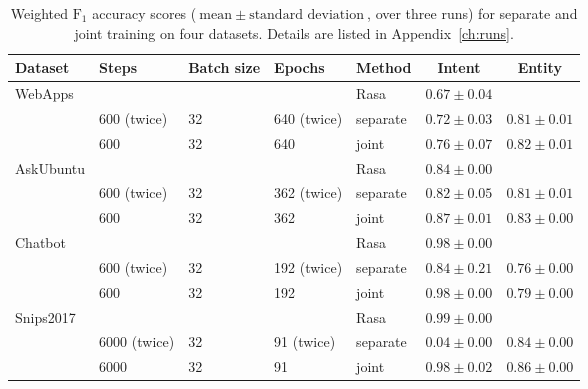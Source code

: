 \begin{table}[htbp]
    \centering
    \begin{tabular}{l l l l l c c}
        \textbf{Dataset}    & \textbf{Steps}  & \textbf{Batch size} & \textbf{Epochs}  & \textbf{Method}   & \textbf{Intent}  & \textbf{Entity}\\
        \hline
        WebApps             & & & & Rasa & $0.67 \pm 0.04$\\
                            & 600 (twice) & 32 & 640 (twice) & separate & $0.72 \pm 0.03$ & $0.81 \pm 0.01$ \\
                            & 600 & 32 & 640 & joint & $0.76 \pm 0.07$ & $0.82 \pm 0.01$ \\
        \hline
        AskUbuntu           & & & & Rasa & $0.84 \pm 0.00$ \\
                            & 600 (twice) & 32 & 362 (twice) & separate & $0.82 \pm 0.05$ & $0.81 \pm 0.01$\\
                            & 600 & 32 & 362 & joint & $0.87 \pm 0.01$ & $0.83 \pm 0.00$\\
        \hline
        Chatbot             & & & & Rasa & $0.98 \pm 0.00$ \\
                            & 600 (twice) & 32 & 192 (twice) & separate & $0.84 \pm 0.21$ & $0.76 \pm 0.00$\\
                            & 600 & 32 & 192 & joint & $0.98 \pm 0.00$ & $0.79 \pm 0.00$\\
        \hline
        Snips2017           & & & & Rasa & $0.99 \pm 0.00$\\
                            & 6000 (twice) & 32 & 91 (twice) & separate & $0.04 \pm 0.00$ & $0.84 \pm 0.00$\\
                            & 6000 & 32 & 91 & joint & $0.98 \pm 0.02$ & $0.86 \pm 0.00$\\
        \hline
    \end{tabular}
    \caption{Weighted $\text{F}_1$ accuracy scores ($\text{mean} \: \pm \: \text{standard deviation}$, over three runs) for separate and joint training on four datasets.
    Details are listed in Appendix~\ref{ch:runs}.}
    \label{tab:runs_scores}
\end{table}

